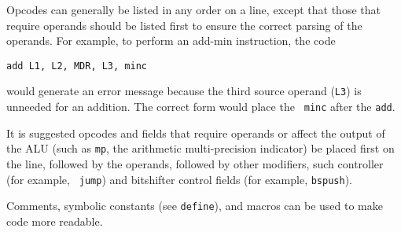 Opcodes can generally be listed in any order on a line, except that
those that require operands should be listed first to ensure the
correct parsing of the operands.  For example, to perform an add-min
instruction, the code
\begin{center}
\tt add L1, L2, MDR, L3, minc
\end{center}
would generate an error message because the third source operand ({\tt L3})
is unneeded for an addition.  The correct form would place the {\tt
minc} after the {\tt add}.

It is suggested opcodes and fields that require operands or affect the
output of the ALU (such as {\tt mp}, the arithmetic multi-precision
indicator) be placed first on the line, followed by the operands,
followed by other modifiers, such  controller (for example, {\tt
jump}) and bitshifter control fields (for example, {\tt bspush}).

Comments, symbolic constants (see {\tt define}), and macros can be
used to make code more readable.



\def\indexentry#1#2{\item #1, #2}

\clearpage






